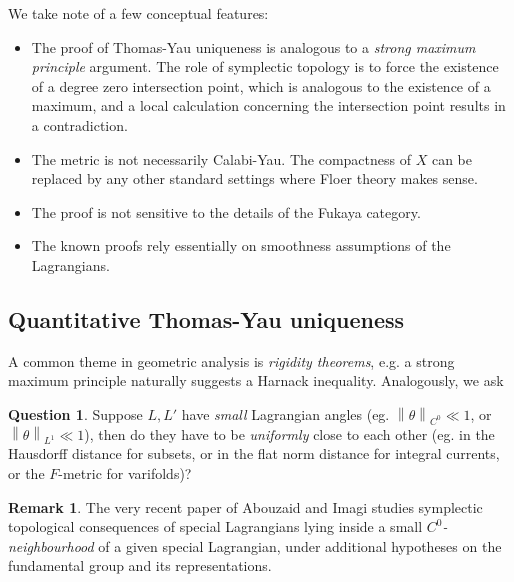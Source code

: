 \documentclass[a4paper]{article}
\theoremstyle{definition}
\newtheorem{rmk}{Remark}
\newtheorem{Question}{Question}
\newcommand{\norm}[1]{\left\lVert#1\right\rVert}
\begin{document}
We take note of a few conceptual features:
\begin{itemize}
\item The proof of Thomas-Yau uniqueness is analogous to a \emph{strong maximum principle} argument. The role of symplectic topology is to force the existence of a degree zero intersection point, which is analogous to the existence of a maximum, and a local calculation concerning the intersection point results in a contradiction.


\item The metric is not necessarily Calabi-Yau. The compactness of $X$ can be replaced by any other standard settings where Floer theory makes sense.

\item  The proof is not sensitive to the details of the Fukaya category. 

\item The known proofs rely essentially on smoothness assumptions of the Lagrangians.




\end{itemize}








\subsection{Quantitative Thomas-Yau uniqueness}




A common theme in geometric analysis is \emph{rigidity theorems}, e.g. a strong maximum principle naturally suggests a Harnack inequality. Analogously, we ask

\begin{Question}
Suppose $L,L'$ have \emph{small} Lagrangian angles (eg. $\norm{\theta}_{C^0}\ll 1$, or $\norm{\theta}_{L^1}\ll 1$), then do they have to be \emph{uniformly} close to each other (eg. in the Hausdorff distance for subsets, or in the flat norm distance for integral currents, or the $F$-metric for varifolds)?
\end{Question}



\begin{rmk}
The very recent paper of Abouzaid and Imagi \cite{AbouzaidImagi} studies symplectic topological consequences of special Lagrangians lying inside a small \emph{$C^0$-neighbourhood} of a given special Lagrangian, under additional hypotheses on the fundamental group and its representations.  
\end{rmk}
\end{document}
